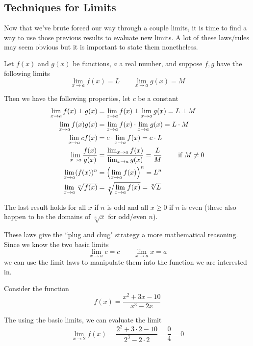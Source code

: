 \newpage 
\subsection{Techniques for Limits}

Now that we've brute forced our way through a couple limits, it is time to find a way to use those previous results to evaluate new limits. A lot of these laws/rules may seem obvious but it is important to state them nonetheless.

\begin{theorem}
	Let $f(x)$ and $g(x)$ be functions, $a$ a real number, and suppose $f,g$ have the following limits
	\[ \lim_{x \to a} f(x) = L \qquad \lim_{x \to a} g(x) = M \]
	
	Then we have the following properties, let $c$ be a constant
	\begin{align*}
		\lim_{x \to a} f(x) \pm g(x) &= \lim_{x \to a} f(x) \pm \lim_{x \to a} g(x) = L \pm M \\
		\lim_{x \to a} f(x)g(x) &= \lim_{x \to a} f(x) \cdot \lim_{x \to a} g(x) = L \cdot M \\
		\lim_{x \to a} cf(x) &= c \cdot \lim_{x \to a} f(x) = c \cdot L \\
		\lim_{x \to a} \frac{f(x)}{g(x)} &= \frac{\lim_{x \to a} f(x)}{\lim_{x \to a} g(x)} = \frac{L}{M} \qquad \text{ if $M \neq 0$} \\
		\lim_{x \to a} (f(x))^n &= \qty(\lim_{x \to a} f(x))^n = L^n \\
		\lim_{x \to a} \sqrt[n]{f(x)} &= \sqrt[n]{\lim_{x \to a} f(x)} = \sqrt[n]{L}
	\end{align*}
	
	The last result holds for all $x$ if $n$ is odd and all $x \geq 0$ if $n$ is even (these also happen to be the domains of $\sqrt[n]{x}$ for odd/even $n$).
\end{theorem}

These laws give the ``plug and chug" strategy a more mathematical reasoning. Since we know the two basic limits
\[ \lim_{x \to a} c = c \qquad \lim_{x \to a} x = a \]
we can use the limit laws to manipulate them into the function we are interested in. 

\begin{example}
	Consider the function
	\[ f(x) = \frac{x^2 + 3x - 10}{x^3 - 2x} \]
	
	The using the basic limits, we can evaluate the limit
	\[ \lim_{x \to 2} f(x) = \frac{2^2 + 3 \cdot 2 - 10}{2^3 - 2 \cdot 2} = \frac{0}{4} = 0 \]
\end{example}

